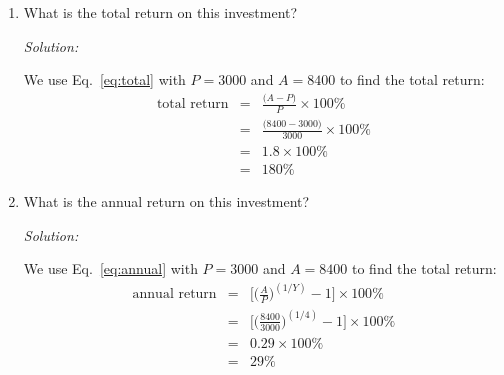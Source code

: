 \documentclass[12pt]{article}
\begin{document}
\begin{enumerate}
\item What is the total return on this investment?

{\it Solution:

We use Eq.~\eqref{eq:total} with $P=3000$ and $A=8400$ to find the total return:
\begin{eqnarray*}
	\text{total return} &=& \frac{\Big(A-P\Big)}{P}\times 100\% \\
	&=& \frac{\Big(8400-3000\Big)}{3000}\times 100\% \\
	&=& 1.8 \times 100\% \\
	&=& 180 \%
\end{eqnarray*}

}
\item What is the annual return on this investment?

{\it Solution:

We use Eq.~\eqref{eq:annual} with $P=3000$ and $A=8400$ to find the total return:
\begin{eqnarray*}
	\text{annual return} &=& \Big[\Big(\frac{A}{P}\Big)^{(1 / Y)} - 1\Big] \times 100\% \\
	&=& \Big[\Big(\frac{8400}{3000}\Big)^{(1 / 4)} - 1\Big] \times 100\% \\
	&=& 0.29 \times 100\% \\
	&=& 29 \%
\end{eqnarray*}

}
\end{enumerate}
\end{document}
